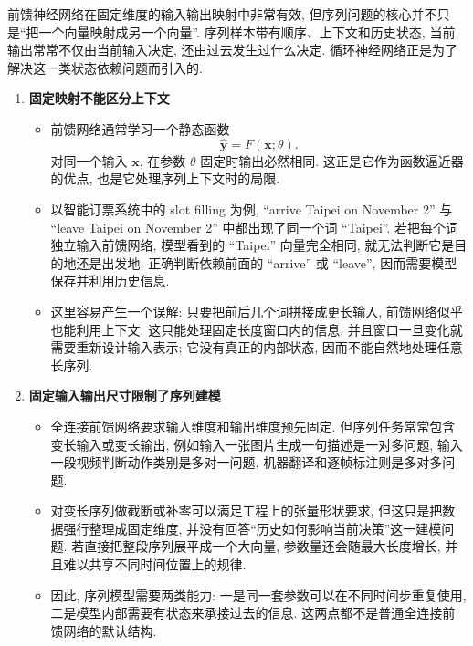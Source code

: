 \documentclass{../nndlcourse}
\begin{document}
前馈神经网络在固定维度的输入输出映射中非常有效, 但序列问题的核心并不只是“把一个向量映射成另一个向量”. 序列样本带有顺序、上下文和历史状态, 当前输出常常不仅由当前输入决定, 还由过去发生过什么决定. 循环神经网络正是为了解决这一类状态依赖问题而引入的.

\begin{enumerate}
  \item \textbf{固定映射不能区分上下文}
    \begin{itemize}
      \item 前馈网络通常学习一个静态函数
      \begin{equation*}
        \hat{\boldsymbol{y}} = F(\boldsymbol{x}; \theta).
      \end{equation*}
      对同一个输入 $\boldsymbol{x}$, 在参数 $\theta$ 固定时输出必然相同. 这正是它作为函数逼近器的优点, 也是它处理序列上下文时的局限.
      \item 以智能订票系统中的 slot filling 为例, ``arrive Taipei on November 2'' 与 ``leave Taipei on November 2'' 中都出现了同一个词 ``Taipei''. 若把每个词独立输入前馈网络, 模型看到的 ``Taipei'' 向量完全相同, 就无法判断它是目的地还是出发地. 正确判断依赖前面的 ``arrive'' 或 ``leave'', 因而需要模型保存并利用历史信息.
      \item 这里容易产生一个误解: 只要把前后几个词拼接成更长输入, 前馈网络似乎也能利用上下文. 这只能处理固定长度窗口内的信息, 并且窗口一旦变化就需要重新设计输入表示; 它没有真正的内部状态, 因而不能自然地处理任意长序列.
    \end{itemize}

  \item \textbf{固定输入输出尺寸限制了序列建模}
    \begin{itemize}
      \item 全连接前馈网络要求输入维度和输出维度预先固定. 但序列任务常常包含变长输入或变长输出, 例如输入一张图片生成一句描述是一对多问题, 输入一段视频判断动作类别是多对一问题, 机器翻译和逐帧标注则是多对多问题.
      \item 对变长序列做截断或补零可以满足工程上的张量形状要求, 但这只是把数据强行整理成固定维度, 并没有回答“历史如何影响当前决策”这一建模问题. 若直接把整段序列展平成一个大向量, 参数量还会随最大长度增长, 并且难以共享不同时间位置上的规律.
      \item 因此, 序列模型需要两类能力: 一是同一套参数可以在不同时间步重复使用, 二是模型内部需要有状态来承接过去的信息. 这两点都不是普通全连接前馈网络的默认结构.
    \end{itemize}


\end{enumerate}
\end{document}

